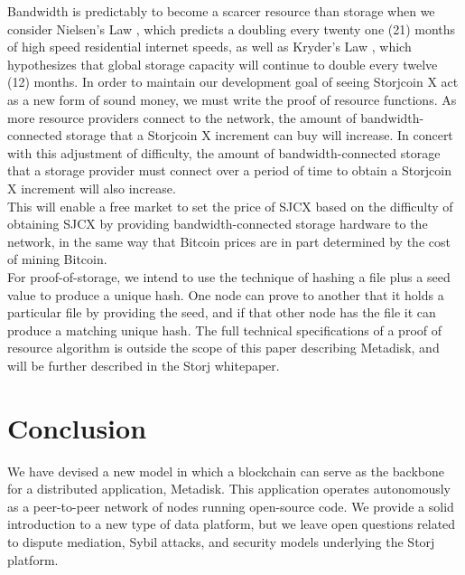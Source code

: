 \documentclass[a4paper,12pt]{article}
\begin{document}
Bandwidth is predictably to become a scarcer resource than storage when we consider Nielsen’s Law \cite{16}, which predicts a doubling every twenty one (21) months of high speed residential internet speeds, as well as Kryder’s Law \cite{17}, which hypothesizes that global storage capacity will continue to double every twelve (12) months.  In order to maintain our development goal of seeing Storjcoin X act as a new form of sound money, we must write the proof of resource functions. As more resource providers connect to the network, the amount of bandwidth-connected storage that a Storjcoin X increment can buy will increase.  In concert with this adjustment of difficulty, the amount of bandwidth-connected storage that a storage provider must connect over a period of time to obtain a Storjcoin X increment will also increase.  \\

This will enable a free market to set the price of SJCX based on the difficulty of obtaining SJCX by providing bandwidth-connected storage hardware to the network, in the same way that Bitcoin prices are in part determined by the cost of mining Bitcoin. \\

For proof-of-storage, we intend to use the technique of hashing a file plus a seed value to produce a unique hash. One node can prove to another that it holds a particular file by providing the seed, and if that other node has the file it can produce a matching unique hash. The full technical specifications of a proof of resource algorithm is outside the scope of this paper describing Metadisk, and will be further described in the Storj whitepaper.

\section*{Conclusion}

We have devised a new model in which a blockchain can serve as the backbone for a distributed application, Metadisk. This application operates autonomously as a peer-to-peer network of nodes running open-source code. We provide a solid introduction to a new type of data platform, but we leave open questions related to dispute mediation, Sybil attacks, and security models underlying the Storj platform.\\


\end{document}
